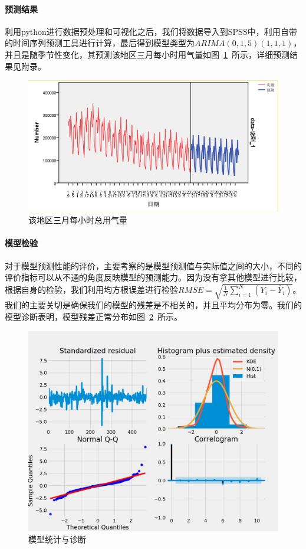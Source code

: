 \documentclass{whutmod}
\begin{document}
	\paragraph{预测结果}
	
	利用python进行数据预处理和可视化之后，我们将数据导入到SPSS中，利用自带的时间序列预测工具进行计算，最后得到模型类型为$ARIMA(0,1,5)(1,1,1)$，并且是随季节性变化，其预测该地区三月每小时用气量如图~\ref{img007}~所示，详细预测结果见附录。
	
	\begin{figure}[H]
		\centering
		\includegraphics[width=\textwidth]{figures/7.png}
		\caption{该地区三月每小时总用气量}\label{img007}
	\end{figure}
	\paragraph{模型检验}
	对于模型预测性能的评价，主要考察的是模型预测值与实际值之间的大小，不同的评价指标可以从不通的角度反映模型的预测能力。因为没有拿其他模型进行比较，根据自身的检验，我们利用均方根误差进行检验$RMSE = \sqrt{\frac{1}{N}\sum_{i=1}^{N}(Y_{i}-\overline{Y}_{i})}$。我们的主要关切是确保我们的模型的残差是不相关的，并且平均分布为零。我们的模型诊断表明，模型残差正常分布如图~\ref{img0010}~所示。
	
	\begin{figure}[H]
		\centering
		\includegraphics[width=.6\textwidth]{figures/111.jpg}
		\caption{模型统计与诊断}\label{img0010}
	\end{figure}
	
\end{document}
